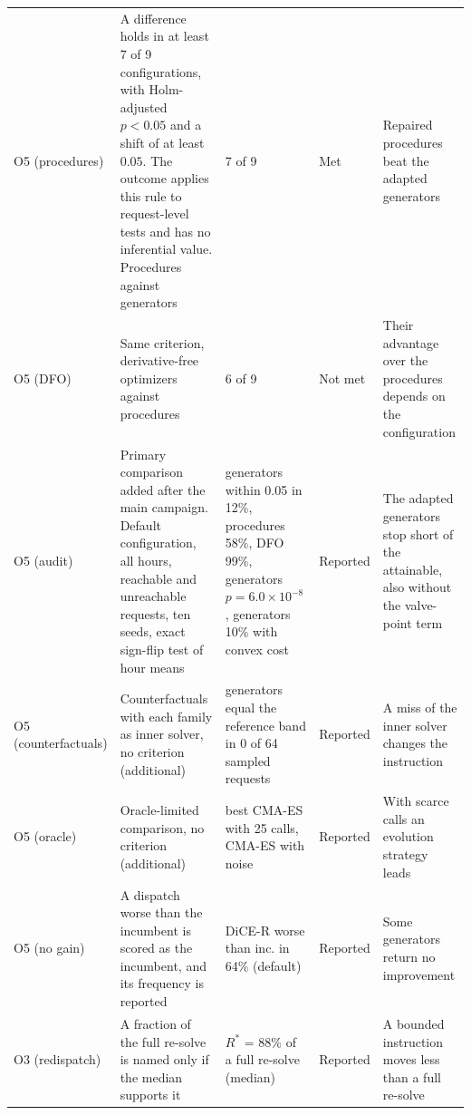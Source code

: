 \begin{tabular}{@{}p{1.9cm}p{5.6cm}p{3.9cm}p{1.5cm}p{3.3cm}@{}}
O5 (procedures) & A difference holds in at least 7 of 9 configurations, with Holm-adjusted $p<0.05$ and a shift of at least $0.05$. The outcome applies this rule to request-level tests and has no inferential value. Procedures against generators & 7 of 9 & Met & Repaired procedures beat the adapted generators \\
O5 (DFO) & Same criterion, derivative-free optimizers against procedures & 6 of 9 & Not met & Their advantage over the procedures depends on the configuration \\
O5 (audit) & Primary comparison added after the main campaign. Default configuration, all hours, reachable and unreachable requests, ten seeds, exact sign-flip test of hour means & generators within 0.05 in 12\%, procedures 58\%, DFO 99\%, generators $p=6.0\times10^{-8}$, generators 10\% with convex cost & Reported & The adapted generators stop short of the attainable, also without the valve-point term \\
O5 (counterfactuals) & Counterfactuals with each family as inner solver, no criterion (additional) & generators equal the reference band in 0 of 64 sampled requests & Reported & A miss of the inner solver changes the instruction \\
O5 (oracle) & Oracle-limited comparison, no criterion (additional) & best CMA-ES with 25 calls, CMA-ES with noise & Reported & With scarce calls an evolution strategy leads \\
O5 (no gain) & A dispatch worse than the incumbent is scored as the incumbent, and its frequency is reported & DiCE-R worse than inc. in 64\% (default) & Reported & Some generators return no improvement \\
O3 (redispatch) & A fraction of the full re-solve is named only if the median supports it & $R^{*}$ = 88\% of a full re-solve (median) & Reported & A bounded instruction moves less than a full re-solve \\
\bottomrule
\end{tabular}

